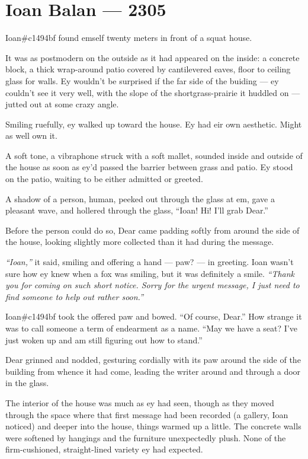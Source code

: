 \hypertarget{ioan-balan-2305}{%
\chapter*{Ioan Balan — 2305}\label{ioan-balan-2305}}

Ioan\#c1494bf found emself twenty meters in front of a squat house.

It was as postmodern on the outside as it had appeared on the inside: a concrete block, a thick wrap-around patio covered by cantilevered eaves, floor to ceiling glass for walls. Ey wouldn't be surprised if the far side of the buiding — ey couldn't see it very well, with the slope of the shortgrass-prairie it huddled on — jutted out at some crazy angle.

Smiling ruefully, ey walked up toward the house. Ey had eir own aesthetic. Might as well own it.

A soft tone, a vibraphone struck with a soft mallet, sounded inside and outside of the house as soon as ey'd passed the barrier between grass and patio. Ey stood on the patio, waiting to be either admitted or greeted.

A shadow of a person, human, peeked out through the glass at em, gave a pleasant wave, and hollered through the glass, ``Ioan! Hi! I'll grab Dear.''

Before the person could do so, Dear came padding softly from around the side of the house, looking slightly more collected than it had during the message.

\emph{``Ioan,''} it said, smiling and offering a hand — paw? — in greeting. Ioan wasn't sure how ey knew when a fox was smiling, but it was definitely a smile. \emph{``Thank you for coming on such short notice. Sorry for the urgent message, I just need to find someone to help out rather soon.''}

Ioan\#c1494bf took the offered paw and bowed. ``Of course, Dear.'' How strange it was to call someone a term of endearment as a name. ``May we have a seat? I've just woken up and am still figuring out how to stand.''

Dear grinned and nodded, gesturing cordially with its paw around the side of the building from whence it had come, leading the writer around and through a door in the glass.

The interior of the house was much as ey had seen, though as they moved through the space where that first message had been recorded (a gallery, Ioan noticed) and deeper into the house, things warmed up a little. The concrete walls were softened by hangings and the furniture unexpectedly plush. None of the firm-cushioned, straight-lined variety ey had expected.

